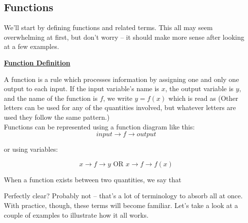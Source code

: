 %
%

\subsection{Functions}

We’ll start by defining functions and related terms. This all may seem overwhelming at first, but don’t worry – it should make more sense after looking at a few examples.\\

\begin{definition}
	\textbf{\underline{Function Definition}}\\
	\bigskip

	A function is a rule which processes information by assigning one and only one output to each input.  If the input variable’s name is $x$, the output variable is $y$, and the name of the function is $f$, we write $y=f(x)$ which is read as  (Other letters can be used for any of the quantities involved, but whatever letters are used they follow the same pattern.)\\
	Functions can be represented using a function diagram like this:\\

	$$input \rightarrow \boxed{f} \rightarrow output$$

	or using variables:

	$$x \rightarrow \boxed{f} \rightarrow y \text{  OR  } x \rightarrow \boxed{f} \rightarrow f(x)$$
	\bigskip

	When a function exists between two quantities, we say that 
\end{definition}

Perfectly clear? Probably not – that’s a lot of terminology to absorb all at once. With practice, though, these terms will become familiar. Let’s take a look at a couple of examples to illustrate how it all works.


